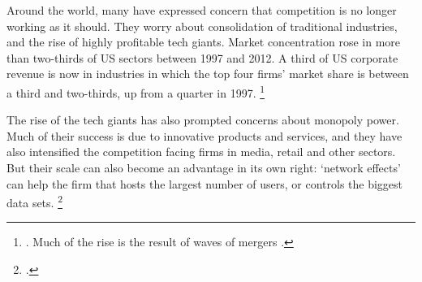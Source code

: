 Around the world, many have expressed concern that competition is no longer working as it should. They worry about consolidation of traditional industries, and the rise of highly profitable tech giants. Market concentration rose in more than two-thirds of US sectors between 1997 and 2012. %
A third of US corporate revenue is now in industries in which the top four firms' market share is between a third and two-thirds, up from a quarter in 1997.%
   \footnote{\textcite{Econtoohigh2016}. Much of the rise is the result of waves of mergers \parencite[][9]{grullon2016us}.}


The rise of the tech giants has also prompted concerns about monopoly power. Much of their success is due to innovative products and services, and they have also intensified the competition facing firms in media, retail and other sectors. But their scale can also become an advantage in its own right: `network effects' can help the firm that hosts the largest number of users, or controls the biggest data sets.%
    \footcites{EzrachiVirtual}{Econsuperstar2016}{FT_Silicon_2016}{FT_GoogleEU_2016}


